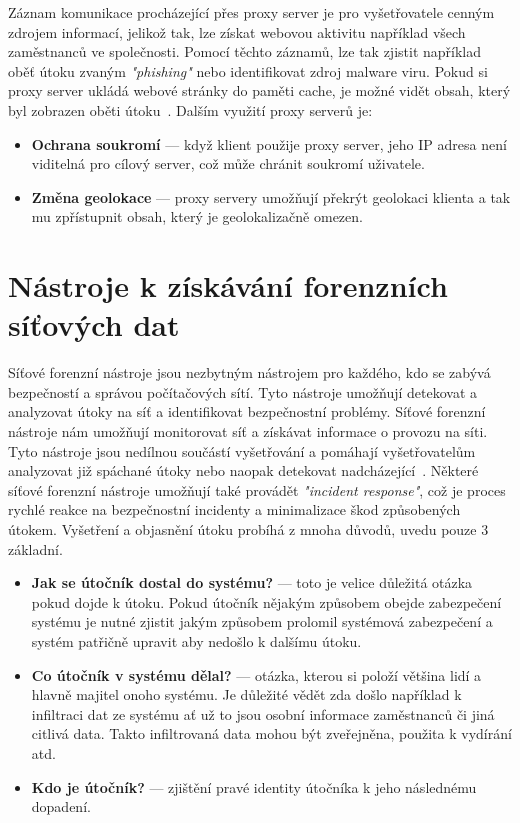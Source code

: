             Záznam komunikace procházející přes proxy server je pro vyšetřovatele cenným zdrojem informací, jelikož tak, lze získat webovou aktivitu například všech zaměstnanců ve společnosti. Pomocí těchto záznamů, lze tak zjistit například oběť útoku zvaným \textit{"phishing"} nebo identifikovat zdroj malware viru. Pokud si proxy server ukládá webové stránky do paměti cache, je možné vidět obsah, který byl zobrazen oběti útoku~\cite{BookTrackingHackersReference}. Dalším využití proxy serverů je:
            \begin{itemize}
                \item \textbf{Ochrana soukromí} --- když klient použije proxy server, jeho \gls{IP} adresa není viditelná pro cílový server, což může chránit soukromí uživatele.
              \item \textbf{Změna geolokace} --- proxy servery umožňují překrýt geolokaci klienta a tak mu zpřístupnit obsah, který je geolokalizačně omezen.
            \end{itemize}
            
\section{Nástroje k získávání forenzních síťových dat}
Síťové forenzní nástroje jsou nezbytným nástrojem pro každého, kdo se zabývá bezpečností a správou počítačových sítí. Tyto nástroje umožňují detekovat a analyzovat útoky na síť a identifikovat bezpečnostní problémy. Síťové forenzní nástroje nám umožňují monitorovat síť a získávat informace o provozu na síti. Tyto nástroje jsou nedílnou součástí vyšetřování a pomáhají vyšetřovatelům analyzovat již spáchané útoky nebo naopak detekovat nadcházející~\cite{FundamentalsOfNetworkForensicsReference}. Některé síťové forenzní nástroje umožňují také provádět \textit{"incident response"}, což je proces rychlé reakce na bezpečnostní incidenty a minimalizace škod způsobených útokem. Vyšetření a objasnění útoku probíhá z mnoha důvodů, uvedu pouze 3 základní. 
    
    \begin{itemize}
        \item \textbf{Jak se útočník dostal do systému?} --- toto je velice důležitá otázka pokud dojde k útoku. Pokud útočník nějakým způsobem obejde zabezpečení systému je nutné zjistit jakým způsobem prolomil systémová zabezpečení a systém patřičně upravit aby nedošlo k dalšímu útoku.
        
        \item \textbf{Co útočník v systému dělal?} --- otázka, kterou si položí většina lidí a hlavně majitel onoho systému. Je důležité vědět zda došlo například k infiltraci dat ze systému ať už to jsou osobní informace zaměstnanců či jiná citlivá data. Takto infiltrovaná data mohou být zveřejněna, použita k vydírání atd.
        
        \item \textbf{Kdo je útočník?} --- zjištění pravé identity  útočníka k jeho následnému dopadení.
    \end{itemize}
    
